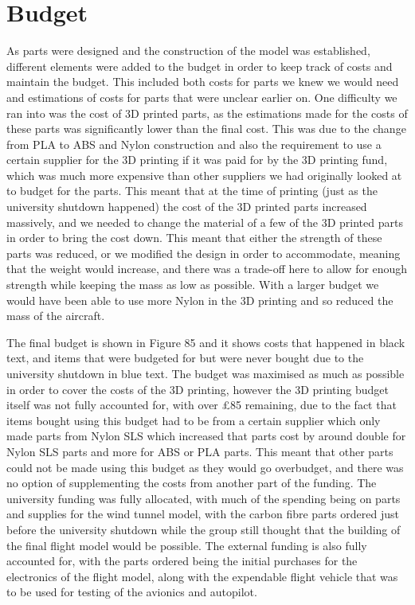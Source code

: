 \documentclass[../../main.tex]{subfiles}
\begin{document}
\section{Budget} \label{sec:project-review:budget}

As parts were designed and the construction of the model was established, different elements were added to the budget in order to keep track of costs and maintain the budget.
This included both costs for parts we knew we would need and estimations of costs for parts that were unclear earlier on.
One difficulty we ran into was the cost of 3D printed parts, as the estimations made for the costs of these parts was significantly lower than the final cost.
This was due to the change from PLA to ABS and Nylon construction and also the requirement to use a certain supplier for the 3D printing if it was paid for by the 3D printing fund, which was much more expensive than other suppliers we had originally looked at to budget for the parts.
This meant that at the time of printing (just as the university shutdown happened) the cost  of the 3D printed parts increased massively, and we needed to change the material of a few of the 3D printed parts in order to bring the cost down.
This meant that either the strength of these parts was reduced, or we modified the design in order to accommodate, meaning that the weight would increase, and there was a trade-off here to allow for enough strength while keeping the mass as low as possible.
With a larger budget we would have been able to use more Nylon in the 3D printing and so reduced the mass of the aircraft. 


The final budget is shown in Figure 85 and it shows costs that happened in black text, and items that were budgeted for but were never bought due to the university shutdown in blue text.
The budget was maximised as much as possible in order to cover the costs of the 3D printing, however the 3D printing budget itself was not fully accounted for, with over £85 remaining, due to the fact that items bought using this budget had to be from a certain supplier which only made parts from Nylon SLS which increased that parts cost by around double for Nylon SLS parts and more for ABS or PLA parts.
This meant that other parts could not be made using this budget as they would go overbudget, and there was no option of supplementing the costs from another part of the funding.
The university funding was fully allocated, with much of the spending being on parts and supplies for the wind tunnel model, with the carbon fibre parts ordered just before the university shutdown while the group still thought that the building of the final flight model would be possible.
The external funding is also fully accounted for, with the parts ordered being the initial purchases for the electronics of the flight model, along with the expendable flight vehicle that was to be used for testing of the avionics and autopilot. 
\end{document}
